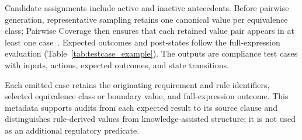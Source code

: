 Candidate assignments include active and inactive antecedents. Before pairwise
generation, representative sampling retains one canonical value per
equivalence class; Pairwise Coverage then ensures that each retained value pair
appears in at least one case~\cite{kuhn2004software,myers2004art}. Expected
outcomes and post-states follow the full-expression evaluation
(Table~\ref{tab:testcase_example}). The outputs are compliance test cases with
inputs, actions, expected outcomes, and state transitions.

Each emitted case retains the originating requirement and rule identifiers,
selected equivalence class or boundary value, and full-expression outcome.
This metadata supports audits from each expected result to its source clause
and distinguishes rule-derived values from knowledge-assisted structure; it is
not used as an additional regulatory predicate.






